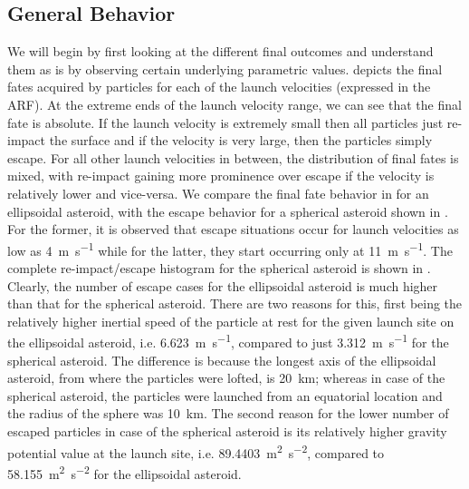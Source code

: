 \subsection{General Behavior}
\label{subsec:general_behavior_noSP}
We will begin by first looking at the different final outcomes and understand them as is by observing certain underlying parametric values.  depicts the final fates acquired by particles for each of the launch velocities (expressed in the \gls{ARF}). At the extreme ends of the launch velocity range, we can see that the final fate is absolute. If the launch velocity is extremely small then all particles just re-impact the surface and if the velocity is very large, then the particles simply escape. For all other launch velocities in between, the distribution of final fates is mixed, with re-impact gaining more prominence over escape if the velocity is relatively lower and vice-versa.
%
\newline\newline
%
We compare the final fate behavior in  for an ellipsoidal asteroid, with the escape behavior for a spherical asteroid shown in . For the former, it is observed that escape situations occur for launch velocities as low as \SI{4}{\metre\per\second} while for the latter, they start occurring only at \SI{11}{\metre\per\second}. The complete re-impact/escape histogram for the spherical asteroid is shown in . Clearly, the number of escape cases for the ellipsoidal asteroid is much higher than that for the spherical asteroid. There are two reasons for this, first being the relatively higher inertial speed of the particle at rest for the given launch site on the ellipsoidal asteroid, i.e. \SI{6.623}{\metre\per\second}, compared to just \SI{3.312}{\metre\per\second} for the spherical asteroid. The difference is because the longest axis of the ellipsoidal asteroid, from where the particles were lofted, is \SI{20}{\kilo\metre}; whereas in case of the spherical asteroid, the particles were launched from an equatorial location and the radius of the sphere was \SI{10}{\kilo\metre}. The second reason for the lower number of escaped particles in case of the spherical asteroid is its relatively higher gravity potential value at the launch site, i.e. \SI{89.4403}{\metre\squared\per\second\squared}, compared to \SI{58.155}{\metre\squared\per\second\squared} for the ellipsoidal asteroid.
%
\newline\newline

